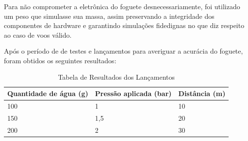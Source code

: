 Para não comprometer a eletrônica do foguete desnecessariamente, foi utilizado um peso que simulasse sua massa, assim preservando a integridade dos componentes de hardware e garantindo simulações fidedignas no que diz respeito ao caso de voos válido. 

Após o período de de testes e lançamentos para averiguar a acurácia do foguete, foram obtidos os seguintes resultados:

\begin{table}[H]
\centering
\setlength{\tabcolsep}{4pt}
\caption{Tabela de Resultados dos Lançamentos}
\begin{tabular}{|l|p{8cm}|l|}
\hline
Quantidade de água (g) & Pressão aplicada (bar) & Distância (m) \\
\hline
100 & 1 & 10 \\
\hline
150 & 1,5 & 20 \\
\hline
200 & 2 & 30 \\
\hline
\end{tabular}
\label{tab:resultados_lancamentos}
\end{table}